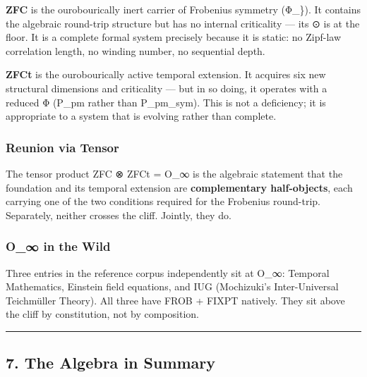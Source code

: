 \textbf{ZFC} is the ourobourically inert carrier of Frobenius symmetry
(Φ\_\}). It contains the algebraic round-trip structure but has no
internal criticality --- its ⊙ is at the floor. It is a complete formal
system precisely because it is static: no Zipf-law correlation length,
no winding number, no sequential depth.

\textbf{ZFCt} is the ourobourically active temporal extension. It
acquires six new structural dimensions and criticality --- but in so
doing, it operates with a reduced Φ (P\_pm rather than P\_pm\_sym). This
is not a deficiency; it is appropriate to a system that is evolving
rather than complete.

\subsubsection{Reunion via Tensor}\label{reunion-via-tensor}

The tensor product ZFC {\igprimfont\upshape ⊗} ZFCt = O\_∞ is the
algebraic statement that the foundation and its temporal extension are
\textbf{complementary half-objects}, each carrying one of the two
conditions required for the Frobenius round-trip. Separately, neither
crosses the cliff. Jointly, they do.

\subsubsection{O\_∞ in the Wild}\label{o_-in-the-wild}

Three entries in the reference corpus independently sit at O\_∞:
Temporal Mathematics, Einstein field equations, and IUG (Mochizuki's
Inter-Universal Teichmüller Theory). All three have FROB + FIXPT
natively. They sit above the cliff by constitution, not by composition.

\begin{center}\rule{0.5\linewidth}{0.5pt}\end{center}

\subsection{7. The Algebra in Summary}\label{the-algebra-in-summary}

